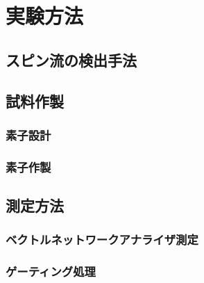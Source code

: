 \documentclass[dvipdfmx]{jsreport}
\numberwithin{equation}{chapter}
\numberwithin{table}{chapter}
\begin{document}
\chapter{実験方法}
\section{スピン流の検出手法}
\section{試料作製}
\subsection{素子設計}
\subsection{素子作製}
\section{測定方法}
\subsection{ベクトルネットワークアナライザ測定}
\subsection{ゲーティング処理}
\end{document}
